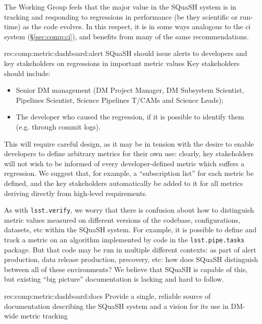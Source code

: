 The Working Group feels that the major value in the SQuaSH system is in tracking and responding to regressions in performance (be they scientific or run-time) as the code evolves.
In this respect, it is in some ways analogous to the \gls{ci} system (\S\ref{sec:comp:ci}), and benefits from many of the same recommendations.

\begin{recommendation}
    {rec:comp:metric:dashboard:alert}
    {SQuaSH should issue alerts to developers and key stakeholders on regressions in important metric values}
    Key stakeholders should include:
    \begin{itemize}
      \item{Senior DM management (DM Project Manager, DM Subsystem Scientist, Pipelines Scientist, Science Pipelines T/CAMs and Science Leads);}
      \item{The developer who caused the regression, if it is possible to identify them (e.g. through commit logs).}
    \end{itemize}
    This will require careful design, as it may be in tension with the desire to enable developers to define arbitrary metrics for their own use: clearly, key stakeholders will not wish to be informed of every developer-defined metric which suffers a regression.
    We suggest that, for example, a ``subscription list'' for each metric be defined, and the key stakeholders automatically be added to it for all metrics deriving directly from high-level requirements.
\end{recommendation}

As with \texttt{lsst.verify}, we worry that there is confusion about how to distinguish metric values measured on different versions of the codebase, configurations, datasets, etc within the SQuaSH system.
For example, it is possible to define and track a metric on an algorithm implemented by code in the \texttt{lsst.pipe.tasks} package.
But that code may be run in multiple different contexts: as part of alert production, data release production, precovery, etc: how does SQuaSH distinguish between all of these environments?
We believe that SQuaSH is capable of this, but existing ``big picture'' documentation is lacking and hard to follow.

\begin{recommendation}
  {rec:comp:metric:dashboard:docs}
  {Provide a single, reliable source of documentation describing the SQuaSH system and a vision for its use in DM-wide metric tracking}
\end{recommendation}

